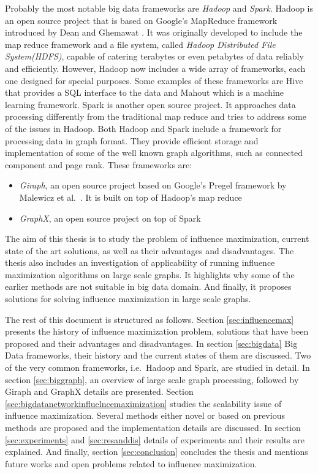 \documentclass[english]{tktltiki}
\begin{document}
Probably the most notable big data frameworks are \textit{Hadoop} and \textit{Spark}. 
Hadoop is an open source project that is based on Google's MapReduce framework introduced by Dean and Ghemawat \cite{dean04}. 
It was originally developed to include the map reduce framework and a file system, called \textit{Hadoop Distributed File System(HDFS)}, capable of catering terabytes or even petabytes of data reliably and efficiently.
However, Hadoop now includes a wide array of frameworks, each one designed for special purposes. 
Some examples of these frameworks are Hive that provides a SQL interface to the data and Mahout which is a machine learning framework.
Spark is another open source project. 
It approaches data processing differently from the traditional map reduce and tries to address some of the issues in Hadoop.
Both Hadoop and Spark include a framework for processing data in graph format. 
They provide efficient storage and implementation of some of the well known graph algorithms, such as connected component and page rank.
These frameworks are:
\begin{itemize}
\item 
\textit{Giraph}, an open source project based on Google's Pregel framework by Malewicz et al.\ \cite{malewicz10}. It is built on top of Hadoop's map reduce
\item 
\textit{GraphX}, an open source project on top of Spark
\end{itemize}

The aim of this thesis is to study the problem of influence maximization, current state of the art solutions, as well as their advantages and disadvantages.
The thesis also includes an investigation of applicability of running influence maximization algorithms on large scale graphs. 
It highlights why some of the earlier methods are not suitable in big data domain. 
And finally, it proposes solutions for solving influence maximization in large scale graphs. 

The rest of this document is structured as follows. 
Section \ref{sec:influencemax} presents the history of influence maximization problem, solutions that have been proposed and their advantages and disadvantages. 
In section \ref{sec:bigdata} Big Data frameworks, their history and the current states of them are discussed. Two of the very common frameworks, i.e.\ Hadoop and Spark, are studied in detail. 
In section \ref{sec:biggraph}, an overview of large scale graph processing, followed by Giraph and GraphX details are presented. 
Section \ref{sec:bigdatanetworkinfluelncemaximization} studies the scalability issue of influence maximization.
Several methods either novel or based on previous methods are proposed and the implementation details are discussed. 
In section \ref{sec:experiments} and \ref{sec:resanddis} details of experiments and their results are explained. 
And finally, section \ref{sec:conclusion} concludes the thesis and mentions future works and open problems related to influence maximization.
\end{document}
